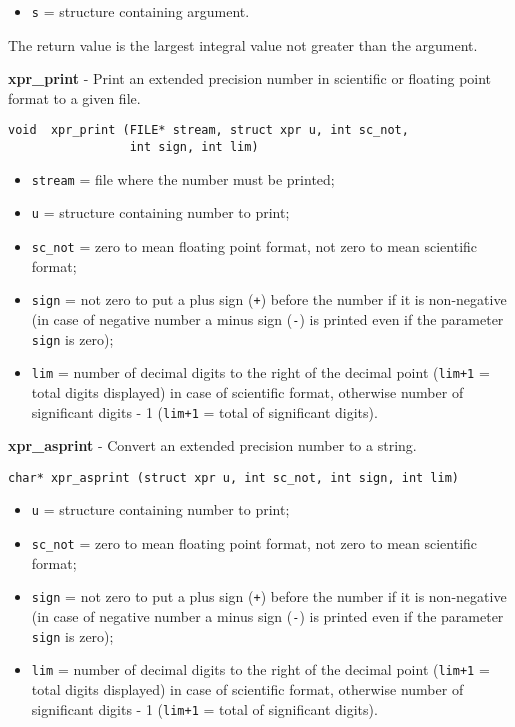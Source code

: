 \documentclass{article}
\begin{document}
\begin{itemize}
\item \texttt{s} = structure containing argument.
\end{itemize}

The return value is the largest integral value not greater than
the argument.


\hrulefill{}

\textbf{xpr\_print} - Print an extended precision number in scientific or 
floating point format to a given file.

\begin{verbatim}
void  xpr_print (FILE* stream, struct xpr u, int sc_not, 
                 int sign, int lim)
\end{verbatim}

\begin{itemize}
\item \texttt{stream} = file where the number must be printed;
\item \texttt{u} = structure containing number to print;
\item \texttt{sc\_not} = zero to mean floating point format, 
not zero to mean scientific format;
\item \texttt{sign}   = not zero to put a plus sign (\texttt{+}) before the number if
it is non-negative (in case of negative number a minus sign (\texttt{-}) 
is printed even if the parameter \texttt{sign} is zero);
\item \texttt{lim}    = number of decimal digits to the right of the
decimal point (\texttt{lim+1} = total digits displayed) in
case of scientific format, otherwise number of significant digits - 1
(\texttt{lim+1} = total of significant digits).
\end{itemize}


\hrulefill{}

\textbf{xpr\_asprint} - Convert an extended precision number to a string.

\begin{verbatim}
char* xpr_asprint (struct xpr u, int sc_not, int sign, int lim)
\end{verbatim}

\begin{itemize}
\item \texttt{u} = structure containing number to print;
\item \texttt{sc\_not} = zero to mean floating point format, not zero to mean scientific format;
\item \texttt{sign}   = not zero to put a plus sign (\texttt{+}) before the number if
it is non-negative (in case of negative number a minus sign (\texttt{-}) 
is printed even if the parameter \texttt{sign} is zero);
\item \texttt{lim}    = number of decimal digits to the right of the
decimal point (\texttt{lim+1} = total digits displayed) in
case of scientific format, otherwise number of significant digits - 1
(\texttt{lim+1} = total of significant digits).
\end{itemize}
\end{document}
